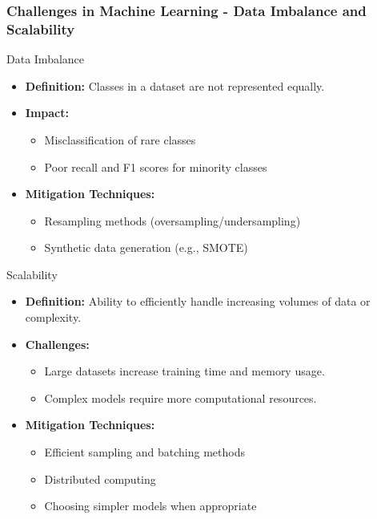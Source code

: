 \documentclass[aspectratio=169]{beamer}
\begin{document}
\begin{frame}[fragile]
    \frametitle{Challenges in Machine Learning - Data Imbalance and Scalability}
    \begin{block}{Data Imbalance}
        \begin{itemize}
            \item \textbf{Definition:} Classes in a dataset are not represented equally.
            \item \textbf{Impact:}
                \begin{itemize}
                    \item Misclassification of rare classes
                    \item Poor recall and F1 scores for minority classes
                \end{itemize}
            \item \textbf{Mitigation Techniques:}
                \begin{itemize}
                    \item Resampling methods (oversampling/undersampling)
                    \item Synthetic data generation (e.g., SMOTE)
                \end{itemize}
        \end{itemize}
    \end{block}

    \begin{block}{Scalability}
        \begin{itemize}
            \item \textbf{Definition:} Ability to efficiently handle increasing volumes of data or complexity.
            \item \textbf{Challenges:}
                \begin{itemize}
                    \item Large datasets increase training time and memory usage.
                    \item Complex models require more computational resources.
                \end{itemize}
            \item \textbf{Mitigation Techniques:}
                \begin{itemize}
                    \item Efficient sampling and batching methods
                    \item Distributed computing
                    \item Choosing simpler models when appropriate
                \end{itemize}
        \end{itemize}
    \end{block}
\end{frame}
\end{document}

